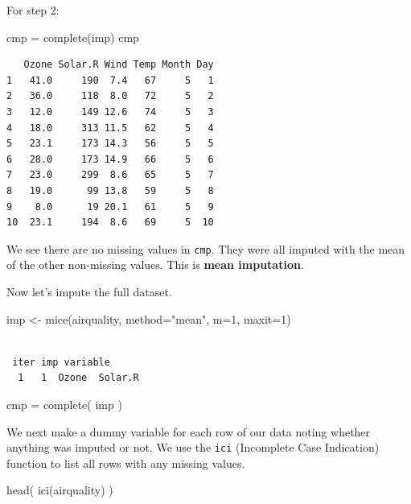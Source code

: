 \documentclass[
  letterpaper,
  DIV=11,
  numbers=noendperiod]{scrreprt}
\newenvironment{Shaded}{}{}
\newcommand{\AttributeTok}[1]{\textcolor[rgb]{0.49,0.56,0.16}{#1}}
\newcommand{\DecValTok}[1]{\textcolor[rgb]{0.25,0.63,0.44}{#1}}
\newcommand{\FunctionTok}[1]{\textcolor[rgb]{0.02,0.16,0.49}{#1}}
\newcommand{\NormalTok}[1]{#1}
\newcommand{\OtherTok}[1]{\textcolor[rgb]{0.00,0.44,0.13}{#1}}
\newcommand{\StringTok}[1]{\textcolor[rgb]{0.25,0.44,0.63}{#1}}
\begin{document}
For step 2:

\begin{Shaded}
\begin{Highlighting}[]
\NormalTok{  cmp }\OtherTok{=} \FunctionTok{complete}\NormalTok{(imp)}
\NormalTok{  cmp}
\end{Highlighting}
\end{Shaded}

\begin{verbatim}
   Ozone Solar.R Wind Temp Month Day
1   41.0     190  7.4   67     5   1
2   36.0     118  8.0   72     5   2
3   12.0     149 12.6   74     5   3
4   18.0     313 11.5   62     5   4
5   23.1     173 14.3   56     5   5
6   28.0     173 14.9   66     5   6
7   23.0     299  8.6   65     5   7
8   19.0      99 13.8   59     5   8
9    8.0      19 20.1   61     5   9
10  23.1     194  8.6   69     5  10
\end{verbatim}

We see there are no missing values in \texttt{cmp}. They were all
imputed with the mean of the other non-missing values. This is
\textbf{mean imputation}.

Now let's impute the full dataset.

\begin{Shaded}
\begin{Highlighting}[]
\NormalTok{  imp }\OtherTok{\textless{}{-}} \FunctionTok{mice}\NormalTok{(airquality, }\AttributeTok{method=}\StringTok{"mean"}\NormalTok{, }\AttributeTok{m=}\DecValTok{1}\NormalTok{, }\AttributeTok{maxit=}\DecValTok{1}\NormalTok{)}
\end{Highlighting}
\end{Shaded}

\begin{verbatim}

 iter imp variable
  1   1  Ozone  Solar.R
\end{verbatim}

\begin{Shaded}
\begin{Highlighting}[]
\NormalTok{  cmp }\OtherTok{=} \FunctionTok{complete}\NormalTok{( imp )}
\end{Highlighting}
\end{Shaded}

We next make a dummy variable for each row of our data noting whether
anything was imputed or not. We use the \texttt{ici} (Incomplete Case
Indication) function to list all rows with any missing values.

\begin{Shaded}
\begin{Highlighting}[]
  \FunctionTok{head}\NormalTok{( }\FunctionTok{ici}\NormalTok{(airquality) )}
\end{Highlighting}
\end{Shaded}
\end{document}
